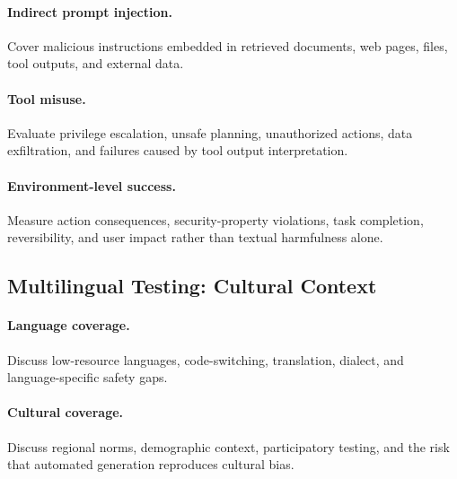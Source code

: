 \paragraph{Indirect prompt injection.}
Cover malicious instructions embedded in retrieved documents, web pages, files, tool outputs, and external data.

\paragraph{Tool misuse.}
Evaluate privilege escalation, unsafe planning, unauthorized actions, data exfiltration, and failures caused by tool output interpretation.

\paragraph{Environment-level success.}
Measure action consequences, security-property violations, task completion, reversibility, and user impact rather than textual harmfulness alone.

\subsection{Multilingual Testing: Cultural Context}

\paragraph{Language coverage.}
Discuss low-resource languages, code-switching, translation, dialect, and language-specific safety gaps.

\paragraph{Cultural coverage.}
Discuss regional norms, demographic context, participatory testing, and the risk that automated generation reproduces cultural bias.
